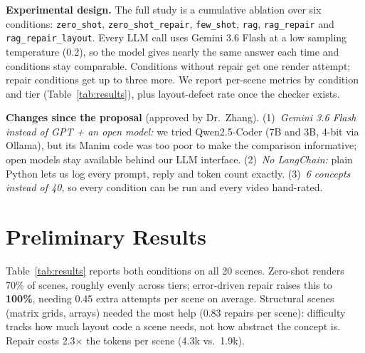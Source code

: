 \documentclass[11pt]{article}
\begin{document}
\textbf{Experimental design.} The full study is a cumulative ablation over six conditions: \texttt{zero\_shot}, \texttt{zero\_shot\_repair}, \texttt{few\_shot}, \texttt{rag}, \texttt{rag\_repair} and \texttt{rag\_repair\_layout}. Every LLM call uses Gemini 3.6 Flash at a low sampling temperature (0.2), so the model gives nearly the same answer each time and conditions stay comparable. Conditions without repair get one render attempt; repair conditions get up to three more. We report per-scene metrics by condition and tier (Table~\ref{tab:results}), plus layout-defect rate once the checker exists.

\textbf{Changes since the proposal} (approved by Dr.~Zhang).
(1)~\emph{Gemini 3.6 Flash instead of GPT + an open model:} we tried Qwen2.5-Coder (7B and 3B, 4-bit via Ollama), but its Manim code was too poor to make the comparison informative; open models stay available behind our LLM interface.
(2)~\emph{No LangChain:} plain Python lets us log every prompt, reply and token count exactly.
(3)~\emph{6 concepts instead of 40,} so every condition can be run and every video hand-rated.

\section{Preliminary Results}

Table~\ref{tab:results} reports both conditions on all 20 scenes. Zero-shot renders 70\% of scenes, roughly evenly across tiers; error-driven repair raises this to \textbf{100\%}, needing 0.45 extra attempts per scene on average. Structural scenes (matrix grids, arrays) needed the most help (0.83 repairs per scene): difficulty tracks how much layout code a scene needs, not how abstract the concept is. Repair costs 2.3$\times$ the tokens per scene (4.3k vs.\ 1.9k).
\end{document}
